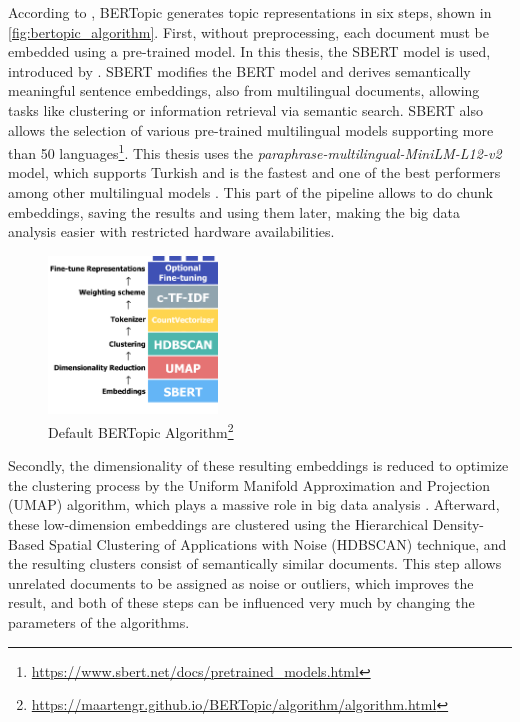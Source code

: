 According to \textcite{bertopic}, BERTopic generates topic representations in six steps,
shown in \autoref{fig:bertopic_algorithm}. 
First, without preprocessing, each document must be embedded using a pre-trained model. 
In this thesis, the SBERT model is used, introduced by \textcite{sentence-bert}. 
SBERT modifies the BERT model and derives semantically meaningful sentence embeddings, 
also from multilingual documents, allowing tasks like clustering or information retrieval 
via semantic search. SBERT also allows the selection of various pre-trained multilingual 
models supporting more than 50 languages\footnote{\url{https://www.sbert.net/docs/pretrained_models.html}}. 
This thesis uses the \textit{paraphrase-multilingual-MiniLM-L12-v2} model, which supports 
Turkish and is the fastest and one of the best performers among other multilingual models 
\parencite{reimers_sbert_multilingual_2020}. This part of the pipeline allows to do 
chunk embeddings, saving the results and using them later, making the big data analysis 
easier with restricted hardware availabilities.

\begin{figure}
    \centering
    \includegraphics[width=0.4\textwidth]{figures/bertopic_algorithm.png}
    \caption[Default BERTopic Algorithm]
    {Default BERTopic Algorithm\footnote{\url{https://maartengr.github.io/BERTopic/algorithm/algorithm.html}}}\label{fig:bertopic_algorithm}
\end{figure}

Secondly, the dimensionality of these resulting embeddings is reduced to optimize the 
clustering process by the Uniform Manifold Approximation and Projection (UMAP) algorithm, 
which plays a massive role in big data analysis \parencite{mcinnes_umap_2020}. 
Afterward, these low-dimension embeddings are clustered using the Hierarchical Density-Based 
Spatial Clustering of Applications with Noise (HDBSCAN) technique, and the resulting 
clusters consist of semantically similar documents. This step allows unrelated documents 
to be assigned as noise or outliers, which improves the result, and both of these 
steps can be influenced very much by changing the parameters of the algorithms.

